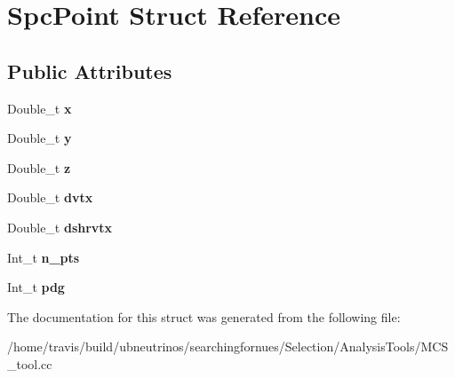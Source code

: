 \hypertarget{structSpcPoint}{}\section{Spc\+Point Struct Reference}
\label{structSpcPoint}
\subsection*{Public Attributes}
\begin{DoxyCompactItemize}
\item 
Double\+\_\+t {\bfseries x}\hypertarget{structSpcPoint_a29bc9a7086c4b5062a33946f6004321c}{}\label{structSpcPoint_a29bc9a7086c4b5062a33946f6004321c}

\item 
Double\+\_\+t {\bfseries y}\hypertarget{structSpcPoint_a8cab39c4c8aa0fd8d49e20e432a1354d}{}\label{structSpcPoint_a8cab39c4c8aa0fd8d49e20e432a1354d}

\item 
Double\+\_\+t {\bfseries z}\hypertarget{structSpcPoint_affe5f55aa723452ccb59d53272c1a405}{}\label{structSpcPoint_affe5f55aa723452ccb59d53272c1a405}

\item 
Double\+\_\+t {\bfseries dvtx}\hypertarget{structSpcPoint_ac08bd5ce7556c538235ec7410f304e35}{}\label{structSpcPoint_ac08bd5ce7556c538235ec7410f304e35}

\item 
Double\+\_\+t {\bfseries dshrvtx}\hypertarget{structSpcPoint_acaabf6827f8626c627b954d3bf07a7ef}{}\label{structSpcPoint_acaabf6827f8626c627b954d3bf07a7ef}

\item 
Int\+\_\+t {\bfseries n\+\_\+pts}\hypertarget{structSpcPoint_aac54edb10e8502ffce70b42069c7fb94}{}\label{structSpcPoint_aac54edb10e8502ffce70b42069c7fb94}

\item 
Int\+\_\+t {\bfseries pdg}\hypertarget{structSpcPoint_aad03f9b74c6bd3e8d58ae5df09253741}{}\label{structSpcPoint_aad03f9b74c6bd3e8d58ae5df09253741}

\end{DoxyCompactItemize}


The documentation for this struct was generated from the following file\+:\begin{DoxyCompactItemize}
\item 
/home/travis/build/ubneutrinos/searchingfornues/\+Selection/\+Analysis\+Tools/M\+C\+S\+\_\+tool.\+cc\end{DoxyCompactItemize}
